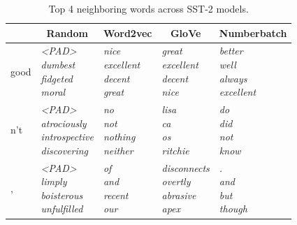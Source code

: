 \documentclass{article}
\begin{document}
\begin{table}
    \caption{Top 4 neighboring words across SST-2 models.}
    \label{neighbor-table}
    \centering
    \begin{tabular}{lllll}
        \toprule
        & \multicolumn{1}{c}{Random} & \multicolumn{1}{c}{Word2vec} & \multicolumn{1}{c}{GloVe} & \multicolumn{1}{c}{Numberbatch} \\
        \midrule
        good & \makecell{\textit{<PAD>} \\ \textit{dumbest} \\ \textit{fidgeted} \\ \textit{moral}} & \makecell{\textit{nice} \\ \textit{excellent} \\ \textit{decent} \\ \textit{great}} & \makecell{\textit{great} \\ \textit{excellent} \\ \textit{decent} \\ \textit{nice}} & \makecell{\textit{better} \\ \textit{well} \\ \textit{always} \\ \textit{excellent}} \\
        \midrule
        n't & \makecell{\textit{<PAD>} \\ \textit{atrociously} \\ \textit{introspective} \\ \textit{discovering}} & \makecell{\textit{no} \\ \textit{not} \\ \textit{nothing} \\ \textit{neither}} & \makecell{\textit{lisa} \\ \textit{ca} \\ \textit{os} \\ \textit{ritchie}} & \makecell{\textit{do} \\ \textit{did} \\ \textit{not} \\ \textit{know}} \\
        \midrule
        , & \makecell{\textit{<PAD>} \\ \textit{limply} \\ \textit{boisterous} \\ \textit{unfulfilled}} & \makecell{\textit{of} \\ \textit{and} \\ \textit{recent} \\ \textit{our}} & \makecell{\textit{disconnects} \\ \textit{overtly} \\ \textit{abrasive} \\ \textit{apex}} & \makecell{\textit{.} \\ \textit{and} \\ \textit{but} \\ \textit{though}} \\
        \bottomrule
    \end{tabular}
\end{table}
\end{document}
